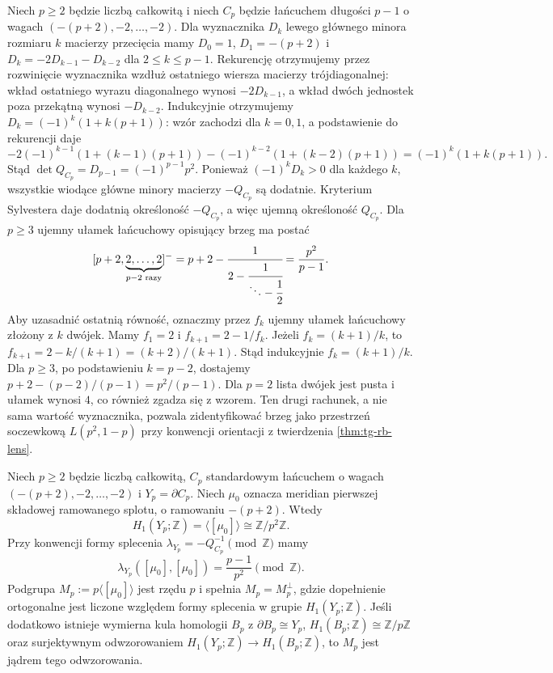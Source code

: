 \begin{przyklad}
\label{ex:tg-syn-cp}
Niech $p\ge2$ będzie liczbą całkowitą i niech $C_p$ będzie łańcuchem długości $p-1$
o wagach $(-(p+2),-2,\ldots,-2)$. Dla wyznacznika
$D_k$ lewego głównego minora rozmiaru $k$ macierzy przecięcia
mamy $D_0=1$, $D_1=-(p+2)$ i
$D_k=-2D_{k-1}-D_{k-2}$ dla $2\le k\le p-1$.
Rekurencję otrzymujemy przez rozwinięcie wyznacznika
wzdłuż ostatniego wiersza macierzy trójdiagonalnej:
wkład ostatniego wyrazu diagonalnego wynosi
$-2D_{k-1}$, a wkład dwóch jednostek
poza przekątną wynosi $-D_{k-2}$.
Indukcyjnie otrzymujemy
$D_k=(-1)^k(1+k(p+1))$: wzór zachodzi dla $k=0,1$,
a podstawienie do rekurencji daje
\[
 -2(-1)^{k-1}(1+(k-1)(p+1))
 -(-1)^{k-2}(1+(k-2)(p+1))
 =(-1)^k(1+k(p+1)).
\]
Stąd $\det Q_{C_p}=D_{p-1}=(-1)^{p-1}p^2$.
Ponieważ $(-1)^kD_k>0$ dla każdego $k$,
wszystkie wiodące główne minory macierzy $-Q_{C_p}$
są dodatnie. Kryterium Sylvestera daje dodatnią
określoność $-Q_{C_p}$, a więc ujemną
określoność $Q_{C_p}$.
Dla $p\ge3$ ujemny ułamek łańcuchowy opisujący brzeg ma postać
\[
[p+2,\underbrace{2,\ldots,2}_{p-2\text{ razy}}]^-
=p+2-\cfrac{1}{2-\cfrac{1}{\ddots-\cfrac12}}
=\frac{p^2}{p-1}.
\]
Aby uzasadnić ostatnią równość, oznaczmy przez $f_k$
ujemny ułamek łańcuchowy złożony z $k$ dwójek.
Mamy $f_1=2$ i $f_{k+1}=2-1/f_k$.
Jeżeli $f_k=(k+1)/k$, to
$f_{k+1}=2-k/(k+1)=(k+2)/(k+1)$.
Stąd indukcyjnie $f_k=(k+1)/k$.
Dla $p\ge3$, po podstawieniu $k=p-2$, dostajemy
$p+2-(p-2)/(p-1)=p^2/(p-1)$.
Dla $p=2$ lista dwójek jest pusta i ułamek wynosi $4$,
co również zgadza się z wzorem.
Ten drugi rachunek, a nie sama wartość wyznacznika,
pozwala zidentyfikować brzeg jako przestrzeń
soczewkową $L(p^2,1-p)$ przy konwencji orientacji
z twierdzenia \ref{thm:tg-rb-lens}.
\end{przyklad}

\begin{lemat}
\label{lem:tg-syn-cp-metabolizer}
Niech $p\ge2$ będzie liczbą całkowitą,
$C_p$ standardowym łańcuchem o wagach
$(-(p+2),-2,\ldots,-2)$ i $Y_p=\partial C_p$.
Niech $\mu_0$ oznacza meridian pierwszej składowej
ramowanego splotu, o ramowaniu $-(p+2)$.
Wtedy
\[
H_1(Y_p;\mathbb Z)=\langle[\mu_0]\rangle
\cong\mathbb Z/p^2\mathbb Z.
\]
Przy konwencji formy splecenia
$\lambda_{Y_p}=-Q_{C_p}^{-1}\pmod{\mathbb Z}$
mamy
\[
\lambda_{Y_p}([\mu_0],[\mu_0])
=\frac{p-1}{p^2}\pmod{\mathbb Z}.
\]
Podgrupa $M_p:=p\langle[\mu_0]\rangle$
jest rzędu $p$ i spełnia $M_p=M_p^\perp$,
gdzie dopełnienie ortogonalne jest liczone
względem formy splecenia w grupie $H_1(Y_p;\mathbb Z)$.
Jeśli dodatkowo istnieje wymierna kula homologii
$B_p$ z $\partial B_p\cong Y_p$,
$H_1(B_p;\mathbb Z)\cong\mathbb Z/p\mathbb Z$
oraz surjektywnym odwzorowaniem
$H_1(Y_p;\mathbb Z)\to H_1(B_p;\mathbb Z)$,
to $M_p$ jest jądrem tego odwzorowania.
\end{lemat}

